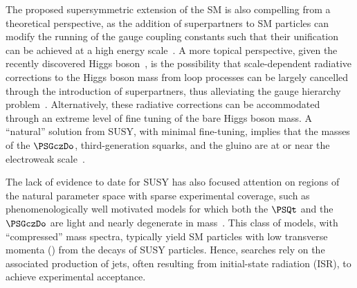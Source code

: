 The proposed supersymmetric extension of the SM is also compelling
from a theoretical perspective, as the addition of superpartners to SM
particles can modify the running of the gauge coupling constants such
that their unification can be achieved at a high energy
scale~\cite{Dimopoulos:1981yj, Ibanez:1981yh, Marciano:1981un}. A more
topical perspective, given the recently discovered Higgs
boson~\cite{ref:atlashiggsdiscovery, ref:cmshiggsdiscovery,
  ref:cmshiggsdiscoverylong}, is the possibility that scale-dependent
radiative corrections to the Higgs boson mass from loop processes can
be largely cancelled through the introduction of superpartners, thus
alleviating the gauge hierarchy problem~\cite{ref:hierarchy1,
  ref:hierarchy2}. Alternatively, these radiative corrections can be
accommodated through an extreme level of fine tuning of the bare Higgs
boson mass. A ``natural'' solution from SUSY, with minimal
fine-tuning, implies that the masses of the $\PSGczDo$,
third-generation squarks, and the gluino are at or near the
electroweak scale~\cite{ref:barbierinsusy}.

The lack of evidence to date for SUSY has also focused attention on
regions of the natural parameter space with sparse experimental
coverage, such as phenomenologically well motivated models for which
both the $\PSQt$ and the $\PSGczDo$ are light and nearly degenerate in
mass~\cite{Boehm:1999bj, Boehm:1999tr, Balazs:2004bu, Martin:2007gf,
  Martin:2007hn, Carena:2008mj, Delgado:2012eu, Grober:2014aha,
  Grober:2015fia}. This class of models, with ``compressed'' mass
spectra, typically yield SM particles with low transverse momenta
(\pt) from the decays of SUSY particles. Hence, searches rely on the
associated production of jets, often resulting from initial-state
radiation (ISR), to achieve experimental acceptance.

